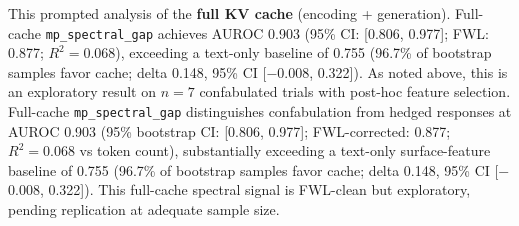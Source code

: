 This prompted analysis of the \textbf{full KV cache}
(encoding + generation). Full-cache \texttt{mp\_spectral\_gap}
achieves AUROC 0.903 (95\% CI: [0.806, 0.977]; FWL: 0.877;
$R^2 = 0.068$), exceeding a text-only baseline of 0.755
(96.7\% of bootstrap samples favor cache; delta 0.148,
95\% CI [$-$0.008, 0.322]). As noted above, this is an exploratory
result on $n = 7$ confabulated trials with post-hoc feature selection.
Full-cache \texttt{mp\_spectral\_gap} distinguishes confabulation from
hedged responses at AUROC 0.903 (95\% bootstrap CI: [0.806, 0.977];
FWL-corrected: 0.877; $R^2 = 0.068$ vs token count), substantially
exceeding a text-only surface-feature baseline of 0.755 (96.7\% of
bootstrap samples favor cache; delta 0.148, 95\% CI [$-$0.008, 0.322]).
This full-cache spectral signal is FWL-clean but exploratory,
pending replication at adequate sample size.
